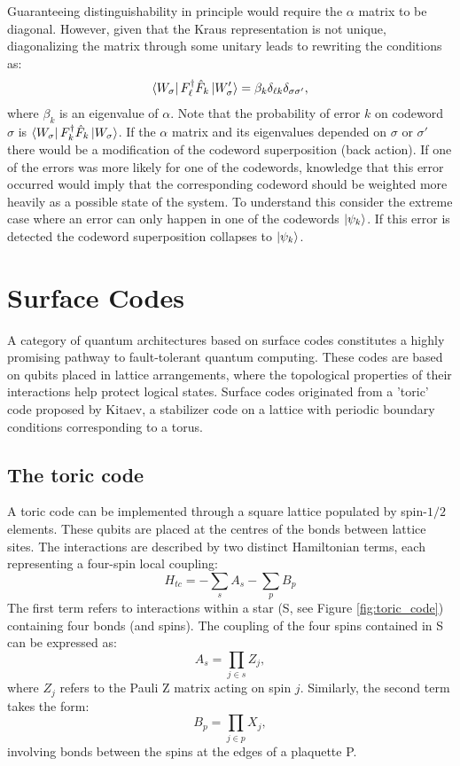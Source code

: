 Guaranteeing distinguishability in principle would require the $\alpha$ matrix to be diagonal. However, given that the Kraus representation is not unique, diagonalizing the matrix through some unitary leads to rewriting the conditions as:
\begin{equation}
    \bra{W_\sigma}  F_\ell^\dagger\hat F_k \ket{W_\sigma'}= \beta_k\delta_{\ell k}\delta_{\sigma\sigma'},
\end{equation}
where $\beta_k$ is an eigenvalue of $\alpha$. Note that the probability of error $k$ on codeword $\sigma$ is $\bra{W_\sigma}  F_k^\dagger\hat F_k \ket{W_\sigma}$. If the $\alpha$ matrix and its eigenvalues depended on $\sigma$ or $\sigma'$ there would be a modification of the codeword superposition (back action). If one of the errors was more likely for one of the codewords, knowledge that this error occurred would imply that the corresponding codeword should be weighted more heavily as a possible state of the system. To understand this consider the extreme case where an error can only happen in one of the codewords $\ket{\psi_k}$. If this error is detected the codeword superposition collapses to $\ket{\psi_k}$.

\section{Surface Codes}

A category of quantum architectures based on surface codes constitutes a highly promising pathway to fault-tolerant quantum computing. These codes are based on qubits placed in lattice arrangements, where the topological properties of their interactions help protect logical states. Surface codes originated from a 'toric' code proposed by Kitaev, a stabilizer code on a lattice with periodic boundary conditions corresponding to a torus.

\subsection{The toric code}

A toric code can be implemented through a square lattice populated by spin-$1/2$ elements. These qubits are placed at the centres of the bonds between lattice sites. The interactions are described by two distinct Hamiltonian terms, each representing a four-spin local coupling:
\begin{equation}
    H_{tc}=-\sum_s A_s -\sum_p B_p
\end{equation}
The first term refers to interactions within a star (S, see Figure \ref{fig:toric_code}) containing four bonds (and spins). The coupling of the four spins contained in S can be expressed as:
\begin{equation}
    A_s=\prod_{j\in s} Z_j,
\end{equation}
where $Z_j$ refers to the Pauli Z matrix acting on spin $j$. Similarly, the second term takes the form:
\begin{equation}
    B_p=\prod_{j\in p} X_j,
\end{equation}
involving bonds between the spins at the edges of a plaquette P.

